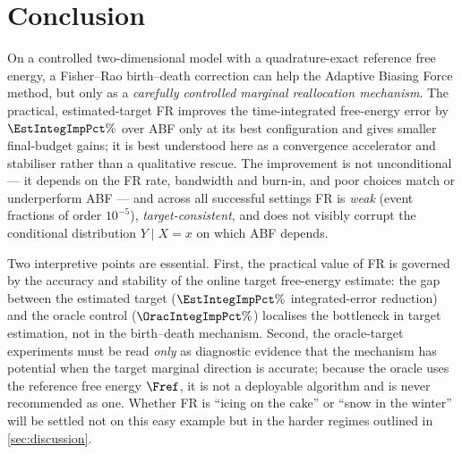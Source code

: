 \section{Conclusion}
\label{sec:conclusion}

On a controlled two-dimensional model with a quadrature-exact reference free
energy, a Fisher--Rao birth--death correction can help the Adaptive Biasing
Force method, but only as a \emph{carefully controlled marginal reallocation
mechanism}. The practical, estimated-target FR improves the time-integrated
free-energy error by $\EstIntegImpPct\%$ over ABF only at its best configuration
and gives smaller final-budget gains; it is best understood here as a
convergence accelerator and stabiliser rather than a qualitative rescue. The
improvement is not unconditional --- it depends on the FR rate, bandwidth and
burn-in, and poor choices match or underperform ABF --- and across all
successful settings FR is \emph{weak} (event fractions of order $10^{-5}$),
\emph{target-consistent}, and does not visibly corrupt the conditional
distribution $Y\mid X=x$ on which ABF depends.

Two interpretive points are essential. First, the practical value of FR is
governed by the accuracy and stability of the online target free-energy
estimate: the gap between the estimated target ($\EstIntegImpPct\%$
integrated-error reduction) and the oracle control ($\OracIntegImpPct\%$)
localises the bottleneck in target estimation, not in the birth--death
mechanism. Second, the oracle-target experiments must be read \emph{only} as
diagnostic evidence that the mechanism has potential when the target marginal
direction is accurate; because the oracle uses the reference free energy
$\Fref$, it is not a deployable algorithm and is never recommended as one.
Whether FR is ``icing on the cake'' or ``snow in the winter'' will be settled
not on this easy example but in the harder regimes outlined in
\cref{sec:discussion}.
